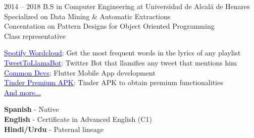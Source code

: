 \documentclass[9pt]{developercv} %
\begin{document}
\begin{entrylist}
	\entry
		{2014 -- 2018}
		{B.S in Computer Engineering at Universidad de Alcalá de Henares}
		{}
		{\\Specialized on Data Mining \& Automatic Extractions\\Concentation on Pattern Designs for Object Oriented Programming\\Class representative}
\end{entrylist}



\begin{minipage}[t]{0.7\textwidth}
	\vspace{-\baselineskip} %


	\href{https://spotifycloud.zamar-roura.com}{\textcolor{blue}{Spotify Wordcloud}}: Get the most frequent words in the lyrics of any playlist \\
	\href{https://twitter.com/TweetToLlamaBot}{\textcolor{blue}{TweetToLlamaBot}}: Twitter Bot that llamifies any tweet that mentions him \\
	\href{https://www.commondevs.com}{\textcolor{blue}{Common Devs}}: Flutter Mobile App development \\
	\href{https://github.com/zamar-roura/tinder-adventures}{\textcolor{blue}{Tinder Premium APK}}: Tinder APK to obtain premium functionalities \\
	\href{https://zamar-roura.com/projects}{\textcolor{blue}{And more...}}\\
\end{minipage}
\begin{minipage}[t]{0.3\textwidth}
	\vspace{-\baselineskip} %

	\textbf{Spanish} - Native\\
	\textbf{English} - Certificate in Advanced English (C1)\\
	\textbf{Hindi/Urdu} - Paternal lineage \\

\end{minipage}



\end{document}
